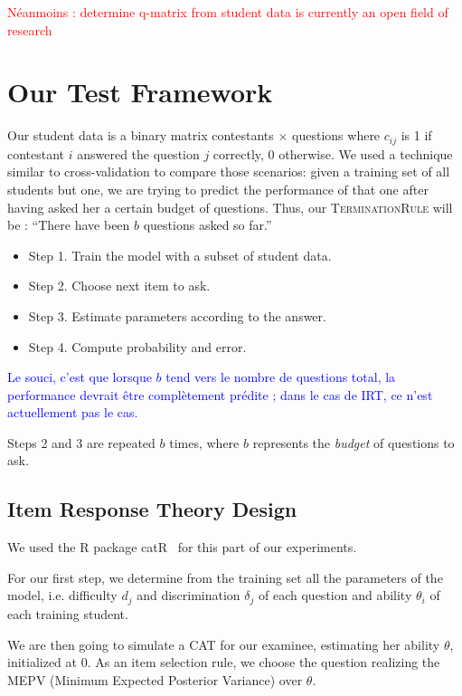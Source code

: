 \documentclass{sig-alternate}
\newcommand\alert[1]{\textcolor{red}{#1}}
\newcommand\note[1]{\textcolor{blue}{#1}}
\begin{document}
\alert{Néanmoins : determine q-matrix from student data is currently an open field of research}

\section{Our Test Framework}

Our student data is a binary matrix contestants $\times$ questions where $c_{ij}$ is 1 if contestant $i$ answered the question $j$ correctly, 0 otherwise. We used a technique similar to cross-validation to compare those scenarios: given a training set of all students but one, we are trying to predict the performance of that one after having asked her a certain budget of questions. Thus, our \textsc{TerminationRule} will be : ``There have been $b$ questions asked so far.''

\begin{itemize}
\item Step 1. Train the model with a subset of student data.
\item Step 2. Choose next item to ask.
\item Step 3. Estimate parameters according to the answer.
\item Step 4. Compute probability and error.
\end{itemize}

\note{Le souci, c'est que lorsque $b$ tend vers le nombre de questions total, la performance devrait être complètement prédite ; dans le cas de IRT, ce n'est actuellement pas le cas.}

Steps 2 and 3 are repeated $b$ times, where $b$ represents the \emph{budget} of questions to ask.

\subsection{Item Response Theory Design}

We used the R package catR~\cite{MagisRaiche12} for this part of our experiments.

For our first step, we determine from the training set all the parameters of the model, i.e. difficulty $d_j$ and discrimination $\delta_j$ of each question and ability $\theta_i$ of each training student.

We are then going to simulate a CAT for our examinee, estimating her ability $\theta$, initialized at 0. As an item selection rule, we choose the question realizing the MEPV (Minimum Expected Posterior Variance) over $\theta$.
\end{document}
